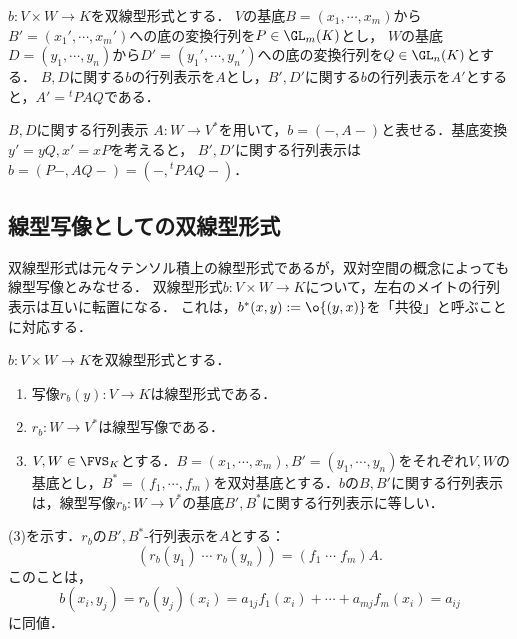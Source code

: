 \documentclass[uplatex, dvipdfmx]{jsreport}
\begin{document}
\begin{proposition}[双線型形式の変換]
    $b:V\times W\to K$を双線型形式とする．
    $V$の基底$B=(x_1,\cdots,x_m)$から$B'=(x_1',\cdots,x_m')$への底の変換行列を$P\in\GL_m(K)$とし，
    $W$の基底$D=(y_1,\cdots,y_n)$から$D'=(y_1',\cdots,y_n')$への底の変換行列を$Q\in\GL_n(K)$とする．
    $B,D$に関する$b$の行列表示を$A$とし，$B',D'$に関する$b$の行列表示を$A'$とすると，$A'={}^t\!PAQ$である．
\end{proposition}
\begin{Proof}
    $B,D$に関する行列表示
    $A:W\to V^*$を用いて，$b=(-,A-)$と表せる．基底変換$y'=yQ,x'=xP$を考えると，
    $B',D'$に関する行列表示は$b=(P-,AQ-)=(-,{}^t\!PAQ-)$．
\end{Proof}

\subsection{線型写像としての双線型形式}

\begin{tcolorbox}[colframe=ForestGreen, colback=ForestGreen!10!white,breakable,colbacktitle=ForestGreen!40!white,coltitle=black,fonttitle=\bfseries\sffamily,
title=]
    双線型形式は元々テンソル積上の線型形式であるが，双対空間の概念によっても線型写像とみなせる．
    双線型形式$b:V\times W\to K$について，左右のメイトの行列表示は互いに転置になる．
    これは，$b^*(x,y):=\o{(y,x)}$を「共役」と呼ぶことに対応する．
\end{tcolorbox}

\begin{proposition}[双線型形式の行列表示の特徴付け]\label{prop-characterization-of-matrix-representation-of-bilinar-form}
    $b:V\times W\to K$を双線型形式とする．
    \begin{enumerate}
        \item 写像$r_b(y):V\to K$は線型形式である．
        \item $r_b:W\to V^*$は線型写像である．
        \item $V,W\in\FVS_K$とする．$B=(x_1,\cdots,x_m),B'=(y_1,\cdots,y_n)$をそれぞれ$V,W$の基底とし，$B^*=(f_1,\cdots,f_m)$を双対基底とする．$b$の$B,B'$に関する行列表示は，線型写像$r_b:W\to V^*$の基底$B',B^*$に関する行列表示に等しい．
    \end{enumerate}
\end{proposition}
\begin{Proof}
    (3)を示す．$r_b$の$B',B^*$-行列表示を$A$とする：
    \[(r_b(y_1)\;\cdots\;r_b(y_n))=(f_1\;\cdots\;f_m)A.\]
    このことは，
    \[b(x_i,y_j)=r_b(y_j)(x_i)=a_{1j}f_1(x_i)+\cdots+a_{mj}f_m(x_i)=a_{ij}\]
    に同値．
\end{Proof}
\end{document}
